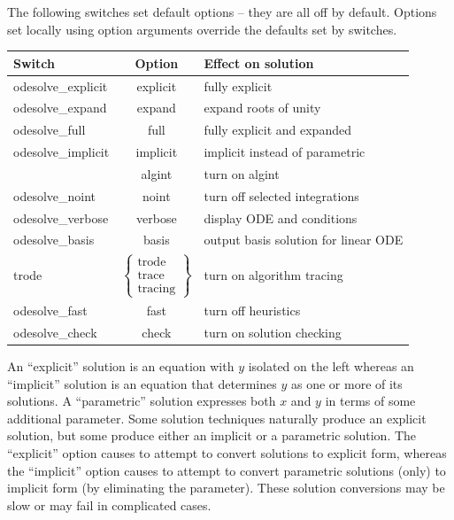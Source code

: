 The following switches set default options -- they are all off by
default.  Options set locally using option arguments override the
defaults set by switches.
\begin{center}
\begin{tabular}{lcl}
\bf Switch         & \bf Option  & \bf Effect on solution \\
\hline
odesolve\_explicit & explicit    & fully explicit \\
odesolve\_expand   & expand      & expand roots of unity \\
odesolve\_full     & full        & fully explicit and expanded \\
odesolve\_implicit & implicit    & implicit instead of parametric \\
                   & algint      & turn on algint \\
odesolve\_noint    & noint       & turn off selected integrations \\
odesolve\_verbose  & verbose     & display ODE and conditions \\
odesolve\_basis    & basis       & output basis solution for linear ODE \\
trode              & $\left\{\begin{array}{c}\mbox{trode}\\\mbox{trace}\\\mbox{tracing}\end{array}\right\}$
                                 & turn on algorithm tracing \\
odesolve\_fast     & fast        & turn off heuristics \\
odesolve\_check    & check       & turn on solution checking
\end{tabular}
\end{center}

An ``explicit'' solution is an equation with $y$ isolated on the left
whereas an ``implicit'' solution is an equation that determines $y$ as
one or more of its solutions.  A ``parametric'' solution expresses
both $x$ and $y$ in terms of some additional parameter.  Some solution
techniques naturally produce an explicit solution, but some produce
either an implicit or a parametric solution.  The ``explicit'' option
causes  to attempt to convert solutions to explicit form,
whereas the ``implicit'' option causes  to attempt to convert
parametric solutions (only) to implicit form (by eliminating the
parameter).  These solution conversions may be slow or may fail in
complicated cases.

